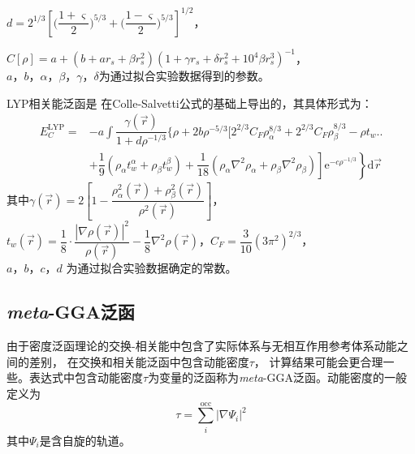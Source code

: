 $d=2^{1/3}\left[\biggl(\dfrac {1+\varsigma}2\biggr)^{5/3}+\biggl(\dfrac{1-\varsigma}2\biggr)^{5/3}\right]^{1/2}$，

$C[\rho]=a+(b+ar_s+\beta r_s^2)(1+\gamma r_s+\delta r_s^2+10^4\beta r_s^3)^{-1}$，\\%
$a$，$b$，$\alpha$，$\beta$，$\gamma$，$\delta$为通过拟合{实验数据}得到的参数。

LYP相关能泛函是%
{在}Colle-Salvetti公式\cite{TCA37-329_1975}{的基础上}导出的，其具体形式为：
\begin{equation}
  \begin{aligned}
	  E_C^{\mathrm{LYP}}=&-a\int\dfrac{\gamma(\vec r)}{1+d\rho^{-1/3}}\biggl\{\rho+2b\rho^{-5/3}\biggl[2^{2/3}C_F\rho_{\alpha}^{8/3}+2^{2/3}C_F\rho_{\beta}^{8/3}-\rho t_w\biggr.\biggr.\\
  &+\left.\left.\dfrac19\left(\rho_{\alpha}t_w^{\alpha}+\rho_{\beta}t_w^{\beta}\right)+\dfrac1{18}\left(\rho_{\alpha}\nabla^2\rho_{\alpha}+\rho_{\beta}\nabla^2\rho_{\beta}\right)\right]\textrm{e}^{-c\rho^{-1/3}}\right\}\textrm{d}\vec r
  \end{aligned}
  \label{eq:dft-20}
\end{equation}
其中$\gamma(\vec r)=2\left[1-\dfrac{\rho_{\alpha}^2(\vec r)+\rho_{\beta}^2(\vec r)}{\rho^2(\vec r)}\right]$，$t_w(\vec r)=\dfrac18\cdot\dfrac{|\nabla\rho(\vec r)|^2}{\rho(\vec r)}-\dfrac18\nabla^2\rho(\vec r)$，$C_F=\dfrac3{10}(3\pi^2)^{2/3}$，\\$a$，$b$，$c$，$d$%
{为通过拟合实验数据确定的}常数。

\subsection{\textit{meta}-GGA泛函}
由于密度泛函理论的交换-相关能中包含了实际体系与无相互作用参考体系动能{之}间的差别，%
在交换和相关能泛函中包含动能密度$\tau$，%
计算结果可能会更合理一些。表达式中包含动能密度$\tau$为变量的泛函称为\textit{meta}-GGA泛函。动能密度的一般定义为
\begin{equation}
	\tau=\sum_i^{\mathrm{occ}}|\nabla\Psi_i|^2
  \label{eq:dft-21}
\end{equation}
其中$\Psi_i$是含自旋的轨道。

